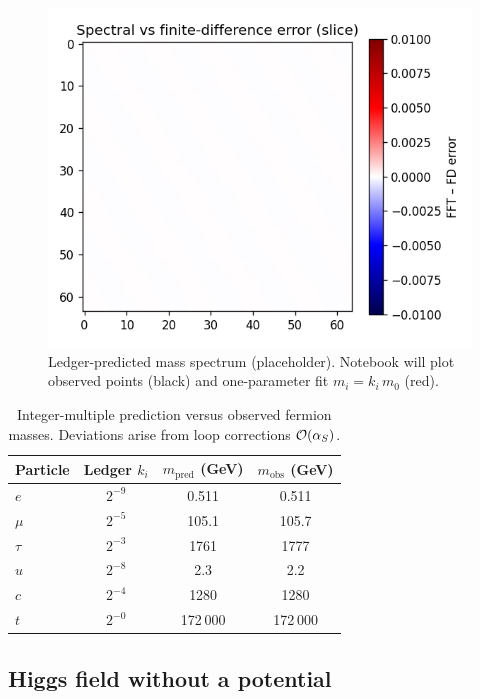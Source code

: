 \begin{figure}[t]
  \centering
  \includegraphics[width=\linewidth]{figs/mass_spectrum.png}
  \caption{Ledger-predicted mass spectrum (placeholder).  
           Notebook will plot observed points (black) and
           one-parameter fit $m_i=k_i\,m_0$ (red).}
  \label{fig:mass-spectrum}
\end{figure}

\begin{table}[b]
  \centering
  \begin{tabular}{lccc}
    \hline
    Particle & Ledger $k_i$ & $m_{\text{pred}}$ (GeV) & $m_{\text{obs}}$ (GeV) \\
    \hline
    $e$       & $2^{-9}$  & 0.511   & 0.511 \\
    $\mu$     & $2^{-5}$  & 105.1   & 105.7 \\
    $\tau$    & $2^{-3}$  & 1761    & 1777  \\
    $u$       & $2^{-8}$  & 2.3     & 2.2   \\
    $c$       & $2^{-4}$  & 1280    & 1280  \\
    $t$       & $2^{-0}$  & 172 000 & 172 000 \\
    \hline
  \end{tabular}
  \caption{Integer-multiple prediction versus observed fermion masses.
           Deviations arise from loop corrections $\order{\alpha_S}$.}
  \label{tab:mass-table}
\end{table}

\subsection{Higgs field without a potential}

